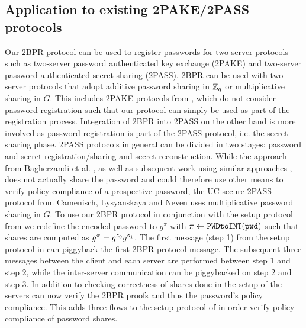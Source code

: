 \subsection{Application to existing 2PAKE/2PASS protocols}
Our 2BPR protocol can be used to register passwords for two-server protocols such as two-server password authenticated key exchange (2PAKE) and two-server password authenticated secret sharing (2PASS).
2BPR can be used with two-server protocols that adopt additive password sharing in $\mathbb{Z}_q$ or multiplicative sharing in $G$.
This includes 2PAKE protocols from \cite{Katz2005,Kiefer14}, which do not consider password registration such that our protocol can simply be used as part of the registration process.
Integration of 2BPR into 2PASS on the other hand is more involved as password registration is part of the 2PASS protocol, i.e. the secret sharing phase.
2PASS protocols in general can be divided in two stages: password and secret registration/sharing and secret reconstruction.
While the approach from Bagherzandi et al. \cite{Bagherzandi2011}, as well as subsequent work using similar approaches \cite{PryvalovK14,CamenischLLN14,JareckiKK14}, does not actually share the password and could therefore use other means to verify policy compliance of a prospective password, the UC-secure 2PASS protocol from Camenisch, Lysyanskaya and Neven \cite{CamenischLN2012} uses multiplicative password sharing in $G$.
To use our 2BPR protocol in conjunction with the setup protocol from \cite{CamenischLN2012} we redefine the encoded password to $g^{\pi}$ with $\pi\gets\texttt{PWDtoINT}(\mathtt{pwd})$ such that shares are computed as $g^{\pi}=g^{\mathfrak{s}_0}g^{\mathfrak{s}_1}$.
The first message (step 1) from the setup protocol in \cite{CamenischLN2012} can piggyback the first 2BPR protocol message.
The subsequent three messages between the client and each server are performed between step 1 and step 2, while the inter-server communication can be piggybacked on step 2 and step 3.
In addition to checking correctness of shares done in the setup of \cite{CamenischLN2012} the servers can now verify the 2BPR proofs and thus the password's policy compliance.
This adds three flows to the setup protocol of \cite{CamenischLN2012} in order verify policy compliance of password shares.
